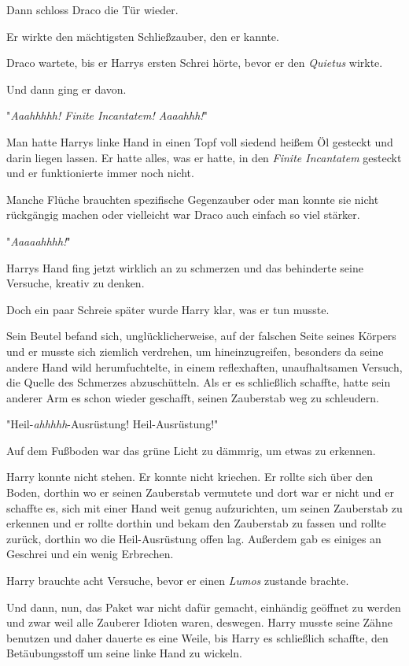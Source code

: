 {Dann schloss Draco die Tür wieder.

Er wirkte den mächtigsten Schließzauber, den er kannte.

Draco wartete, bis er Harrys ersten Schrei hörte, bevor er den \emph{Quietus} wirkte.

Und dann ging er davon.

\later

"\emph{Aaahhhhh! Finite Incantatem! Aaaahhh!}"

Man hatte Harrys linke Hand in einen Topf voll siedend heißem Öl gesteckt und darin liegen lassen. Er hatte alles, was er hatte, in den \emph{Finite Incantatem} gesteckt und er funktionierte immer noch nicht.

Manche Flüche brauchten spezifische Gegenzauber oder man konnte sie nicht rückgängig machen oder vielleicht war Draco auch einfach so viel stärker.

"\emph{Aaaaahhhh!}"

Harrys Hand fing jetzt wirklich an zu schmerzen und das behinderte seine Versuche, kreativ zu denken.

Doch ein paar Schreie später wurde Harry klar, was er tun musste.

Sein Beutel befand sich, unglücklicherweise, auf der falschen Seite seines Körpers und er musste sich ziemlich verdrehen, um hineinzugreifen, besonders da seine andere Hand wild herumfuchtelte, in einem reflexhaften, unaufhaltsamen Versuch, die Quelle des Schmerzes abzuschütteln. Als er es schließlich schaffte, hatte sein anderer Arm es schon wieder geschafft, seinen Zauberstab weg zu schleudern.

"Heil-\emph{ahhhhh}-Ausrüstung! Heil-Ausrüstung!"

Auf dem Fußboden war das grüne Licht zu dämmrig, um etwas zu erkennen.

Harry konnte nicht stehen. Er konnte nicht kriechen. Er rollte sich über den Boden, dorthin wo er seinen Zauberstab vermutete und dort war er nicht und er schaffte es, sich mit einer Hand weit genug aufzurichten, um seinen Zauberstab zu erkennen und er rollte dorthin und bekam den Zauberstab zu fassen und rollte zurück, dorthin wo die Heil-Ausrüstung offen lag. Außerdem gab es einiges an Geschrei und ein wenig Erbrechen.

Harry brauchte acht Versuche, bevor er einen \emph{Lumos} zustande brachte.

Und dann, nun, das Paket war nicht dafür gemacht, einhändig geöffnet zu werden und zwar weil alle Zauberer Idioten waren, deswegen. Harry musste seine Zähne benutzen und daher dauerte es eine Weile, bis Harry es schließlich schaffte, den Betäubungsstoff um seine linke Hand zu wickeln.

}
